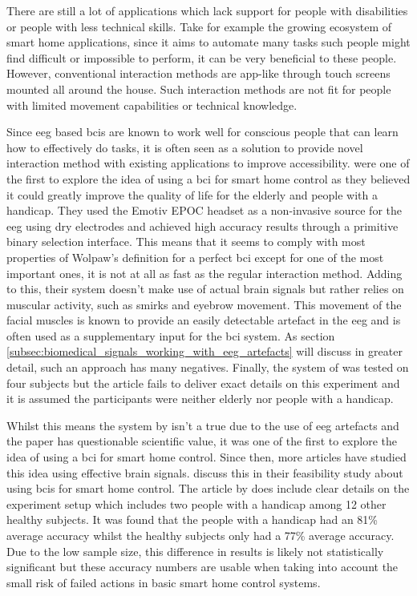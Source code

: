 There are still a lot of applications which lack support for people with disabilities or people with less technical skills.
Take for example the growing ecosystem of smart home applications, since it aims to automate many tasks such people might find difficult or impossible to perform, it can be very beneficial to these people.
However, conventional interaction methods are app-like through touch screens mounted all around the house.
Such interaction methods are not fit for people with limited movement capabilities or technical knowledge.

Since \gls{eeg} based \glspl{bci} are known to work well for conscious people that can learn how to effectively do  tasks, it is often seen as a solution to provide novel interaction method with existing applications to improve accessibility.
 were one of the first to explore the idea of using a \gls{bci} for smart home control as they believed it could greatly improve the quality of life for the elderly and people with a handicap.
They used the Emotiv EPOC headset as a non-invasive source for the \gls{eeg} using dry electrodes and achieved high accuracy results through a primitive binary selection interface.
This means that it seems to comply with most properties of Wolpaw's definition for a perfect \gls{bci} except for one of the most important ones, it is not at all as fast as the regular interaction method.
Adding to this, their system doesn't make use of actual brain signals but rather relies on muscular activity, such as smirks and eyebrow movement.
This movement of the facial muscles is known to provide an easily detectable artefact in the \gls{eeg} and is often used as a supplementary input for the \gls{bci} system.
As section \ref{subsec:biomedical_signals_working_with_eeg_artefacts} will discuss in greater detail, such an approach has many negatives.
Finally, the system of \citet{bci_smart_home_app} was tested on four subjects but the article fails to deliver exact details on this experiment and it is assumed the participants were neither elderly nor people with a handicap.

Whilst this means the system by \citet{bci_smart_home_app} isn't a true  due to the use of \gls{eeg} artefacts and the paper has questionable scientific value, it was one of the first to explore the idea of using a \gls{bci} for smart home control.
Since then, more articles have studied this idea using effective brain signals.
 discuss this in their feasibility study about using \glspl{bci} for smart home control.
The article by \citet{feasibility_bci_smart_home} does include clear details on the experiment setup which includes two people with a handicap among 12 other healthy subjects.
It was found that the people with a handicap had an 81\% average accuracy whilst the healthy subjects only had a 77\% average accuracy.
Due to the low sample size, this difference in results is likely not statistically significant but these accuracy numbers are usable when taking into account the small risk of failed actions in basic smart home control systems.

